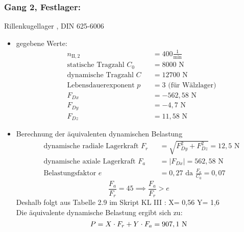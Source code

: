 \subsubsection{Gang 2, Festlager:} Rillenkugellager , DIN 625-6006\\
\begin{itemize}
	\item gegebene Werte:
	\begin{align*}
	&n_{{\mathord{\mathrm{II}},2}} &&=  400 \frac{1}{\text{min}} \\
	&\text{statische Tragzahl } C_{0} &&= 8000 \text{ N}\\
	&\text{dynamische Tragzahl } C &&= 12700 \text{ N} \\
	&\text{Lebensdauerexponent } p &&= 3 \text{ (für Wälzlager)} \\
	&F_{Dx} && = -562,58 \text{ N}\\
	&F_{Dy} && = -4,7 \text{ N}\\
	&F_{Dz} && = 11,58 \text{ N}
	\end{align*} 
	\item Berechnung der äquivalenten dynamischen Belastung
	\begin{align*}
	&\text{dynamische radiale Lagerkraft } F_r&& = \sqrt{F_{Dy}^2 + F_{Dz}^2 } = 12,5 \text{ N} \\
	&\text{dynamische axiale Lagerkraft } F_a&& = |F_{Dx}| = 562,58 \text{ N}\\
	&\text{Belastungsfaktor } e &&= 0,27 \text{ da } \frac{F_a}{C_0} = 0,07
	\end{align*}
	\[\frac{F_a}{F_r} = 45 \implies \frac{F_a}{F_r} > e\]
	Deshalb folgt aus Tabelle 2.9 im Skript KL III : X= 0,56 \text{, } Y= 1,6 \\
	Die äquivalente dynamische Belastung ergibt sich zu: 
	\[
	P= X \cdot F_r + Y \cdot F_a = 907,1 \text{ N}
	\]
\end{itemize}
\newpage
